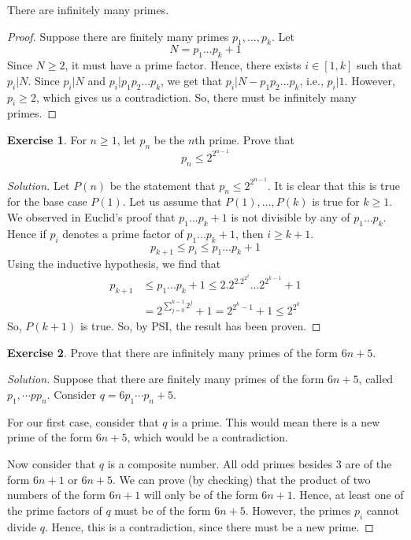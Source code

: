 \documentclass[12pt,letterpaper]{book}
\theoremstyle{definition}
\newtheorem*{exercise}{Exercise}
\newenvironment{solution}
  {\renewcommand\qedsymbol{$\blacksquare$}\begin{proof}[Solution]}
  {\end{proof}}
\begin{document}
\begin{theorem}[Euclid]
  There are infinitely many primes.
\end{theorem}

\begin{proof}
  Suppose there are finitely many primes $p_1,...,p_k$. Let
  \[N = p_1...p_k + 1\]
  Since $N \geq 2$, it must have a prime factor. Hence, there exists $i \in [1,k]$ such that $p_i | N$. Since $p_i|N$ and $p_i|p_1p_2...p_k$, we get that $p_i|N-p_1p_2...p_k$, i.e., $p_i|1$. However, $p_i \geq 2$, which gives us a contradiction. So, there must be infinitely many primes.
\end{proof}

\begin{exercise}
  For $n \geq 1$, let $p_n$ be the $n$th prime. Prove that
  \[p_n \leq 2^{2^{n-1}}\]
\end{exercise}

\begin{solution}
  Let $P(n)$ be the statement that $p_n \leq 2^{2^{n-1}}$. It is clear that this is true for the base case $P(1)$. Let us assume that $P(1),...,P(k)$ is true for $k \geq 1$.
  We observed in Euclid's proof that $p_1...p_k+1$ is not divisible by any of $p_1...p_k$. Hence if $p_i$ denotes a prime factor of $p_1...p_k+1$, then $i \geq k+1$.
  \[p_{k+1} \leq p_i \leq p_1...p_k+1\]
  Using the inductive hypothesis, we find that
  \begin{align*}
    p_{k+1} &\leq p_1...p_k+1 \leq 2.2^2.2^{2^2}...2^{2^{k-1}}+1 \\
            &= 2^{\sum_{j=0}^{k-1} 2^j}+1 = 2^{2^k-1}+1 \leq 2^{2^k}
  \end{align*}
  So, $P(k+1)$ is true. So, by PSI, the result has been proven.
\end{solution}

\begin{exercise}
  Prove that there are infinitely many primes of the form $6n+5$.
\end{exercise}
\begin{solution}
  Suppose that there are finitely many primes of the form $6n+5$, called $p_1,\cdots pp_n$. Consider $q = 6p_1\cdots p_n+5$.

  For our first case, consider that $q$ is a prime. This would mean there is a new prime of the form $6n+5$, which would be a contradiction.

  Now consider that $q$ is a composite number. All odd primes besides 3 are of the form $6n+1$ or $6n+5$. We can prove (by checking) that the product of two numbers of the form $6n+1$ will only be of the form $6n+1$. Hence, at least one of the prime factors of $q$ must be of the form $6n+5$. However, the primes $p_i$ cannot divide $q$. Hence, this is a contradiction, since there must be a new prime.
\end{solution}
\end{document}
